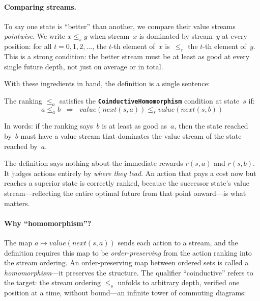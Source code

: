 \documentclass[runningheads]{llncs}
\begin{document}
\paragraph{Comparing streams.}
To say one state is ``better'' than another, we compare their value streams \emph{pointwise}.
We write $x \le_s y$ when stream~$x$ is dominated by stream~$y$ at every position: for all $t = 0, 1, 2, \ldots$, the $t$-th element of~$x$ is~$\le_r$ the $t$-th element of~$y$.
This is a strong condition: the better stream must be at least as good at every single future depth, not just on average or in total.

\medskip

With these ingredients in hand, the definition is a single sentence:

\begin{definition}\label{def:coind-homo}
The ranking $\le_a$ satisfies the \textbf{\texttt{CoinductiveHomomorphism}} condition at state~$s$ if:
\[
a \le_a b \;\;\Longrightarrow\;\; \mathit{value}(\mathit{next}(s,a)) \le_s \mathit{value}(\mathit{next}(s,b))
\]
\end{definition}

\noindent In words: if the ranking says~$b$ is at least as good as~$a$, then the state reached by~$b$ must have a value stream that dominates the value stream of the state reached by~$a$.

The definition says nothing about the immediate rewards $r(s,a)$ and $r(s,b)$.
It judges actions entirely by \emph{where they lead}.
An action that pays a cost now but reaches a superior state is correctly ranked, because the successor state's value stream---reflecting the entire optimal future from that point onward---is what matters.

\paragraph{Why ``homomorphism''?}
The map $a \mapsto \mathit{value}(\mathit{next}(s,a))$ sends each action to a stream, and the definition requires this map to be \emph{order-preserving} from the action ranking into the stream ordering.
An order-preserving map between ordered sets is called a \emph{homomorphism}---it preserves the structure.
The qualifier ``coinductive'' refers to the target: the stream ordering $\le_s$ unfolds to arbitrary depth, verified one position at a time, without bound---an infinite tower of commuting diagrams:
\end{document}
